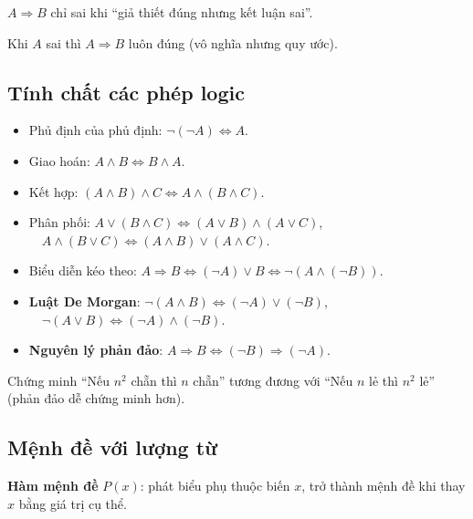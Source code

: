 \documentclass[12pt,a4paper]{article}
\begin{document}
\begin{luuy}
  $A \Rightarrow B$ chỉ sai khi ``giả thiết đúng nhưng kết luận sai''. 
  
  Khi $A$ sai thì $A \Rightarrow B$ luôn đúng (vô nghĩa nhưng quy ước).
\end{luuy}

\subsection{Tính chất các phép logic}

\begin{tinhchat}
  \begin{itemize}
    \item Phủ định của phủ định: $\neg(\neg A) \Leftrightarrow A$.
    \item Giao hoán: $A \wedge B \Leftrightarrow B \wedge A$.
    \item Kết hợp: $(A \wedge B) \wedge C \Leftrightarrow A \wedge (B \wedge C)$.
    \item Phân phối: $A \vee (B \wedge C) \Leftrightarrow (A \vee B) \wedge (A \vee C)$, $\quad A \wedge (B \vee C) \Leftrightarrow (A \wedge B) \vee (A \wedge C)$.
    \item Biểu diễn kéo theo: $A \Rightarrow B \Leftrightarrow (\neg A) \vee B \Leftrightarrow \neg(A \wedge (\neg B))$.
    \item \textbf{Luật De Morgan}: $\neg(A \wedge B) \Leftrightarrow (\neg A) \vee (\neg B)$, $\quad \neg(A \vee B) \Leftrightarrow (\neg A) \wedge (\neg B)$.
    \item \textbf{Nguyên lý phản đảo}: $A \Rightarrow B \Leftrightarrow (\neg B) \Rightarrow (\neg A)$.
  \end{itemize}
\end{tinhchat}

\begin{vidu}
  Chứng minh ``Nếu $n^2$ chẵn thì $n$ chẵn'' tương đương với ``Nếu $n$ lẻ thì $n^2$ lẻ'' (phản đảo dễ chứng minh hơn).
\end{vidu}

\subsection{Mệnh đề với lượng từ}

\begin{dinhnghia}
  \textbf{Hàm mệnh đề} $P(x)$: phát biểu phụ thuộc biến $x$, trở thành mệnh đề khi thay $x$ bằng giá trị cụ thể.
\end{dinhnghia}
\end{document}
